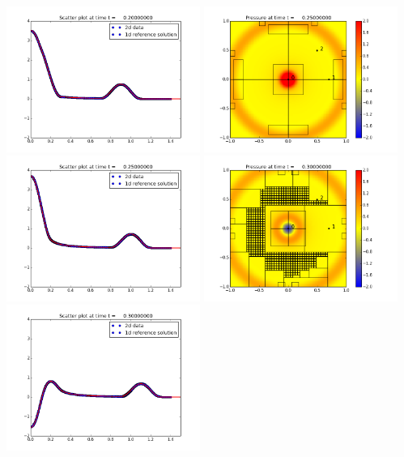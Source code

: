 \documentclass[11pt]{article}
\begin{document}
\includegraphics[width=0.475\textwidth]{frame0004fig3.png}
\vskip 10pt 
\includegraphics[width=0.475\textwidth]{frame0005fig0.png}
\includegraphics[width=0.475\textwidth]{frame0005fig3.png}
\vskip 10pt 
\includegraphics[width=0.475\textwidth]{frame0006fig0.png}
\includegraphics[width=0.475\textwidth]{frame0006fig3.png}
\end{document}
